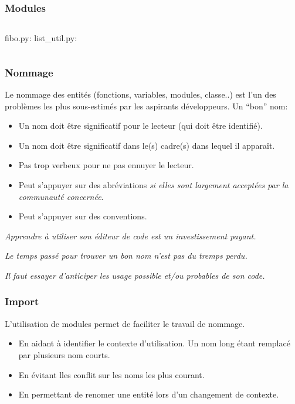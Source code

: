 \documentclass{beamer}
\begin{document}
\begin{frame}[fragile]\frametitle{Modules}
  \begin{columns}
    fibo.py:
    \newline
    \fbox{}
    list\_util.py:
    \newline
    \fbox{}
  \end{columns}
  \fbox{}
\end{frame}

\begin{frame}[fragile]\frametitle{Nommage}
  
  Le nommage des entités (fonctions, variables, modules, classe..) est l'un des problèmes les plus sous-estimés par les aspirants développeurs.\linebreak
  Un ``bon'' nom:
  \begin{itemize}
  \item Un nom doit être significatif pour le lecteur (qui doit être identifié).
  \item Un nom doit être significatif dans le(s) cadre(s) dans lequel il apparaît.
  \item Pas trop verbeux pour ne pas ennuyer le lecteur.
  \item Peut s'appuyer sur des abréviations {\em si elles sont largement acceptées par la communauté concernée}.
  \item Peut s'appuyer sur des conventions.
  \end{itemize}

  {\em Apprendre à utiliser son éditeur de code est un investissement payant.}

  {\em Le temps passé pour trouver un bon nom n'est pas du tremps perdu.}

  {\em Il faut essayer d'anticiper les usage possible et/ou probables de son code.}
  
\end{frame}

\begin{frame}[fragile]\frametitle{Import}
  
  L'utilisation de modules permet de faciliter le travail de nommage.
  \begin{itemize}
  \item En aidant à identifier le contexte d'utilisation. Un nom long étant remplacé par plusieurs nom courts.
  \item En évitant lles conflit sur les noms les plus courant.
  \item En permettant de renomer une entité lors d'un changement de contexte.
  \end{itemize}
  \fbox{}
  \fbox{}
\end{frame}
\end{document}
